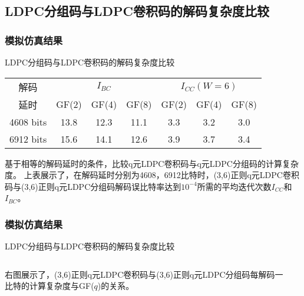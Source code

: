 \documentclass{beamer}
\begin{document}
\subsection{LDPC分组码与LDPC卷积码的解码复杂度比较}
\begin{frame}[shrink]
	\frametitle{模拟仿真结果}
		\begin{block}{LDPC分组码与LDPC卷积码的解码复杂度比较}
		\begin{center}
		\begin{tabular}{|c|c|c|c|c|c|c|}
 \hline
解码 & \multicolumn{3}{|c|}{$I_{BC}$} & \multicolumn{3}{|c|}{$I_{CC}(W=6)$} \\ \cline{2-7}
延时 & GF(2) & GF(4) & GF(8) & GF(2) & GF(4) & GF(8) \\ \hline
4608 bits & 13.8 & 12.3 & 11.1 & 3.3 & 3.2 & 3.0\\ \hline
6912 bits & 15.6 & 14.1 & 12.6 & 3.9 & 3.7 & 3.4\\ \hline
\end{tabular}
\end{center}
基于相等的解码延时的条件，比较q元LDPC卷积码与q元LDPC分组码的计算复杂度。
上表展示了，在解码延时分别为4608，6912比特时，(3,6)正则q元LDPC卷积码与(3,6)正则q元LDPC分组码解码误比特率达到$10^{-4}$所需的平均迭代次数$I_{CC}$和$I_{BC}$。
		\end{block}
\end{frame}
\begin{frame}[shrink]
	\frametitle{模拟仿真结果}
		\begin{block}{LDPC分组码与LDPC卷积码的解码复杂度比较}
		\begin{columns}
		\begin{column}{0.4\textwidth}
		右图展示了，(3,6)正则q元LDPC卷积码与(3,6)正则q元LDPC分组码每解码一比特的计算复杂度与GF($q$)的关系。
		\end{column}
		\begin{column}{0.6\textwidth}
		\begin{center}
\end{center}
		\end{column}
		\end{columns}
		\end{block}
\end{frame}
\end{document}
